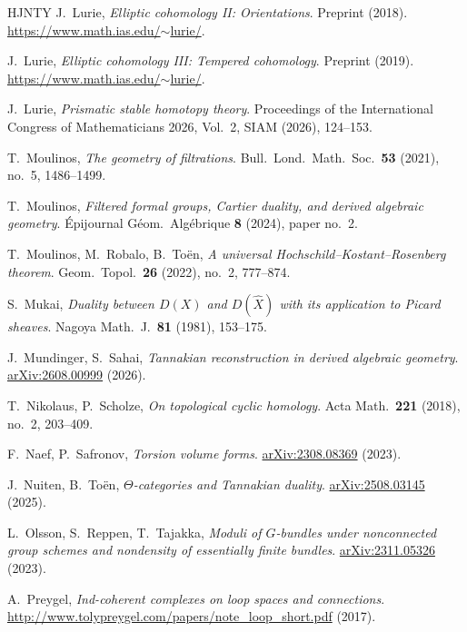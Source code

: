 \documentclass[12pt, oneside]{amsart}
\newcommand\arXiv[1]{\href{http://arxiv.org/abs/#1}{arXiv:#1}}
\numberwithin{equation}{section}
\theoremstyle{remark}
\theoremstyle{plain}
\begin{document}
\begin{thebibliography}{HJNTY}
   J.~Lurie, \textit{Elliptic cohomology II: Orientations}. Preprint (2018). \href{https://www.math.ias.edu/~lurie/}{https://www.math.ias.edu/$\sim$lurie/}.

   J.~Lurie, \textit{Elliptic cohomology III: Tempered cohomology}. Preprint (2019). \href{https://www.math.ias.edu/~lurie/}{https://www.math.ias.edu/$\sim$lurie/}.

   J.~Lurie, \textit{Prismatic stable homotopy theory}. Proceedings of the International Congress of Mathematicians 2026, Vol.~2, SIAM (2026), 124--153.

   T.~Moulinos, \textit{The geometry of filtrations}. Bull.\ Lond.\ Math.\ Soc.\ {\bf{53}} (2021), no.~5, 1486--1499.

   T.~Moulinos, \textit{Filtered formal groups, Cartier duality, and derived algebraic geometry}. \'Epijournal G\'eom.\ Alg\'ebrique {\bf{8}} (2024), paper no.~2.

   T.~Moulinos, M.~Robalo, B.~To\"en, \textit{A universal Hochschild--Kostant--Rosenberg theorem}. Geom.\ Topol.\ {\bf{26}} (2022), no.~2, 777--874.

   S.~Mukai, \textit{Duality between $D(X)$ and $D(\hat{X})$ with its application to Picard sheaves}. Nagoya Math.\ J.\ {\bf{81}} (1981), 153--175.

   J.~Mundinger, S.~Sahai, \textit{Tannakian reconstruction in derived algebraic geometry}. \arXiv{2608.00999} (2026).

   T.~Nikolaus, P.~Scholze, \textit{On topological cyclic homology}. Acta Math.\ {\bf{221}} (2018), no.~2, 203--409.

   F.~Naef, P.~Safronov, \textit{Torsion volume forms}. \arXiv{2308.08369} (2023).

   J.~Nuiten, B.~To\"en, \textit{$\Theta$-categories and Tannakian duality}. \arXiv{2508.03145} (2025).

   L.~Olsson, S.~Reppen, T.~Tajakka, \textit{Moduli of $G$-bundles under nonconnected group schemes and nondensity of essentially finite bundles}. \arXiv{2311.05326} (2023).

   A.~Preygel, \textit{Ind-coherent complexes on loop spaces and connections}. \href{http://www.tolypreygel.com/papers/note_loop_short.pdf}{http://www.tolypreygel.com/papers/note\_loop\_short.pdf} (2017).


\end{thebibliography}
\end{document}
